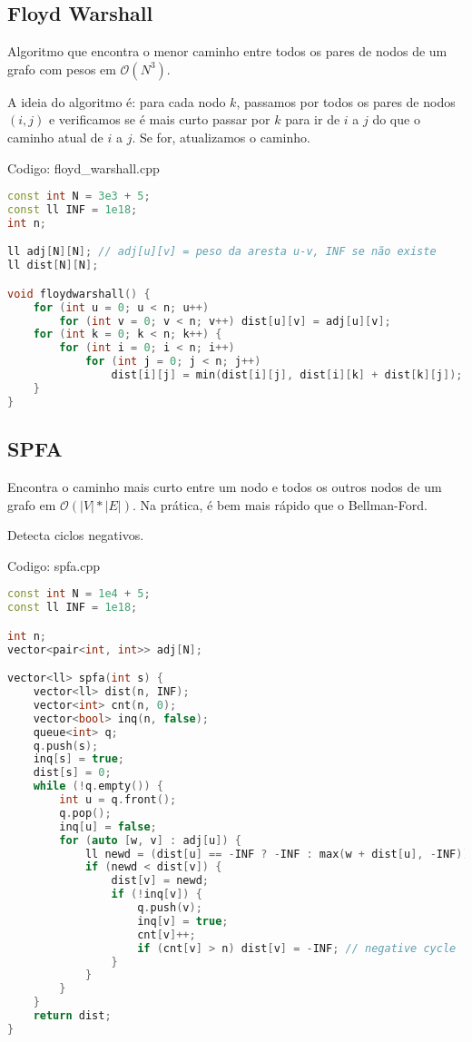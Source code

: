 \documentclass[10pt, a4paper, oneside]{book}
\begin{document}
\subsection{Floyd Warshall}


Algoritmo que encontra o menor caminho entre todos os pares de nodos de um grafo com pesos em $\mathcal{O}(N^3)$.



A ideia do algoritmo é: para cada nodo $k$, passamos por todos os pares de nodos $(i, j)$ e verificamos se é mais curto passar por $k$ para ir de $i$ a $j$ do que o caminho atual de $i$ a $j$. Se for, atualizamos o caminho.
\hfill

Codigo: floyd\_warshall.cpp

\begin{lstlisting}[language=C++]
const int N = 3e3 + 5;
const ll INF = 1e18;
int n;

ll adj[N][N]; // adj[u][v] = peso da aresta u-v, INF se não existe
ll dist[N][N];

void floydwarshall() {
    for (int u = 0; u < n; u++)
        for (int v = 0; v < n; v++) dist[u][v] = adj[u][v];
    for (int k = 0; k < n; k++) {
        for (int i = 0; i < n; i++)
            for (int j = 0; j < n; j++)
                dist[i][j] = min(dist[i][j], dist[i][k] + dist[k][j]);
    }
}\end{lstlisting}
\hfill

\subsection{SPFA}


Encontra o caminho mais curto entre um nodo e todos os outros nodos de um grafo em $\mathcal{O}(|V| * |E|)$. Na prática, é bem mais rápido que o Bellman-Ford.



Detecta ciclos negativos.
\hfill

Codigo: spfa.cpp

\begin{lstlisting}[language=C++]
const int N = 1e4 + 5;
const ll INF = 1e18;

int n;
vector<pair<int, int>> adj[N];

vector<ll> spfa(int s) {
    vector<ll> dist(n, INF);
    vector<int> cnt(n, 0);
    vector<bool> inq(n, false);
    queue<int> q;
    q.push(s);
    inq[s] = true;
    dist[s] = 0;
    while (!q.empty()) {
        int u = q.front();
        q.pop();
        inq[u] = false;
        for (auto [w, v] : adj[u]) {
            ll newd = (dist[u] == -INF ? -INF : max(w + dist[u], -INF));
            if (newd < dist[v]) {
                dist[v] = newd;
                if (!inq[v]) {
                    q.push(v);
                    inq[v] = true;
                    cnt[v]++;
                    if (cnt[v] > n) dist[v] = -INF; // negative cycle
                }
            }
        }
    }
    return dist;
}
\end{lstlisting}
\hfill
\end{document}
